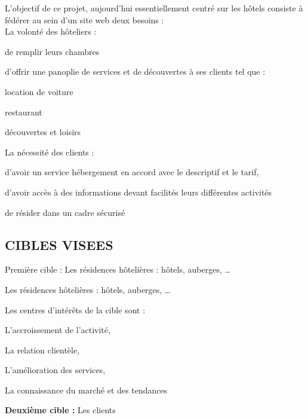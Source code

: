 L’objectif de ce projet, aujourd’hui essentiellement centré sur les hôtels consiste à fédérer au sein d’un site web deux besoins :\\


La volonté des hôteliers : 
\begin{list}{•}{ }
 \item de remplir leurs chambres 
 \item d’offrir une panoplie de services et de découvertes à ses clients tel que :
 \begin{list}{-}{ }
  \item location de voiture 
  \item restaurant 
  \item découvertes et loisirs
 \end{list}  

\end{list}

 La nécessité des clients : 
 
\begin{list}{•}{ }
\item d’avoir un service hébergement en accord avec le descriptif et le tarif, 
\item d’avoir accès à des informations devant facilités leurs différentes activités 
\item de résider dans un cadre sécurisé 
\end{list}

\subsection{CIBLES VISEES}

Première cible : Les résidences hôtelières : hôtels, auberges, … 
\begin{list}{•}{ }
	\item Les résidences hôtelières : hôtels, auberges, … 
    \item Les centres d’intérêts de la cible sont : 
    \begin{list}{•}{ }
     \item L’accroissement de l’activité, 
     \item La relation clientèle, 
     \item L’amélioration des services, 
     \item La connaissance du marché et des tendances 
    \end{list}

\end{list}
\textbf{Deuxième cible :} Les clients 

